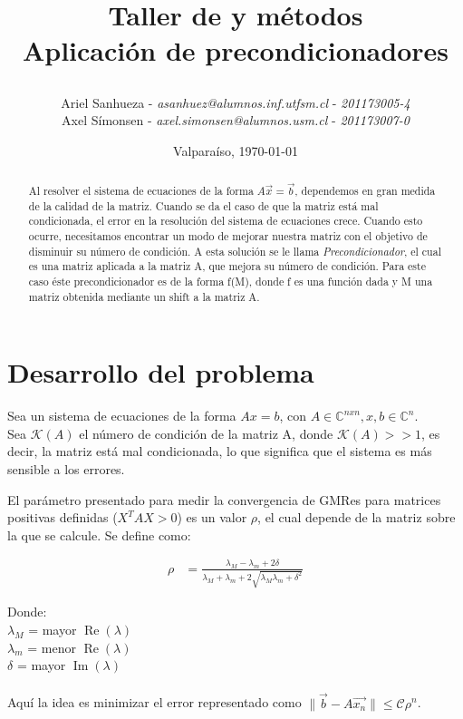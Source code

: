 \documentclass[fleqn]{article}
\title{\textbf{Taller de \DIFdelbegin \DIFdel{módelos }\DIFdelend \DIFaddbegin \DIFadd{modelos }\DIFaddend y métodos\RIGHTBRACE\\Aplicación de precondicionadores}
    \author{Ariel Sanhueza - \textit{asanhuez@alumnos.inf.utfsm.cl} - \textit{201173005-4}\\
    {Axel Símonsen - \textit{axel.simonsen@alumnos.usm.cl} - \textit{201173007-0}}}}
\date{\vspace*{1cm} Valparaíso, \today}
\begin{document}
\maketitle

\begin{abstract}
Al resolver el sistema de ecuaciones de la forma $A\vec{x}=\vec{b}$, dependemos en gran medida de la calidad de la matriz. Cuando se da el caso de que la matriz está mal condicionada, el error en la resolución del sistema de ecuaciones crece. Cuando esto ocurre, necesitamos encontrar un modo de mejorar nuestra matriz con el objetivo de disminuir su número de condición. A esta solución se le llama \emph{Precondicionador}, el cual es una matriz aplicada a la matriz A, que mejora su número de condición. Para este caso éste precondicionador es de la forma f(M), donde f es una función dada y M una matriz obtenida mediante un shift a la matriz A.
\end{abstract}

\section{Desarrollo del problema}

Sea un sistema de ecuaciones de la forma $Ax = b$, con $A \in \mathbb{C}^{nxn}, x, b \in \mathbb{C}^{n}$.\\
Sea $\mathcal{K}(A)$ el número de condición de la matriz A, donde
$\mathcal{K}(A) >> 1$, es decir, la matriz está mal condicionada, lo que significa que el sistema es más sensible a los errores.

El parámetro presentado para medir la convergencia de GMRes para matrices positivas definidas ($X^TAX > 0$) es un valor $\rho$, el cual depende de la matriz sobre la que se calcule. Se define como:

\begin{align*}
\rho &= \frac{\lambda_M - \lambda_m + 2\delta}{\lambda_M + \lambda_m + 2\sqrt{\lambda_M \lambda_m + \delta^2}}
\end{align*}


Donde:\\
$\lambda_{M}$ = mayor $\operatorname{Re}(\lambda)$\\
$\lambda_{m}$ = menor $\operatorname{Re}(\lambda)$\\
$\delta$ = mayor $\operatorname{Im}(\lambda)$\\
\\

Aquí la idea es minimizar el error representado como
$ \|\vec{b} - A\vec{x_{n}}\| \le \mathcal{C}\rho^n$.
\end{document}
